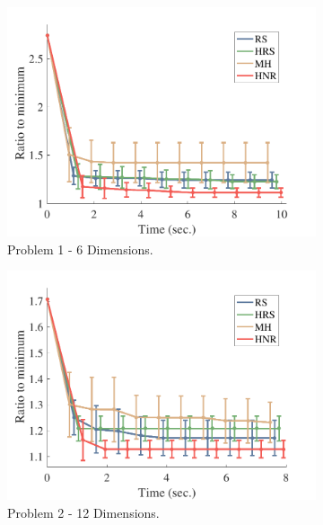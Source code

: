 \documentclass[letterpaper, 10 pt, conference]{ieeeconf}  %
\begin{document}
\begin{figure}[t!]
	\centering
	\begin{subfigure}[b]{0.325\textwidth}
		\includegraphics[width=\linewidth]{fig/planning_efficiency/3dof_general}
		\caption{\captionstyle Problem 1 - 6 Dimensions.}
		\label{fig:planning_efficiency:3dof:general}
	\end{subfigure}	
	\begin{subfigure}[b]{0.325\textwidth}
		\includegraphics[width=\linewidth]{fig/planning_efficiency/6dof_hammering}
		\caption{\captionstyle Problem 2 - 12 Dimensions.}
		\label{fig:planning_efficiency:6dof:hammering}
	\end{subfigure}
	\begin{subfigure}[b]{0.325\textwidth}

\end{subfigure}
\end{figure}
\end{document}
